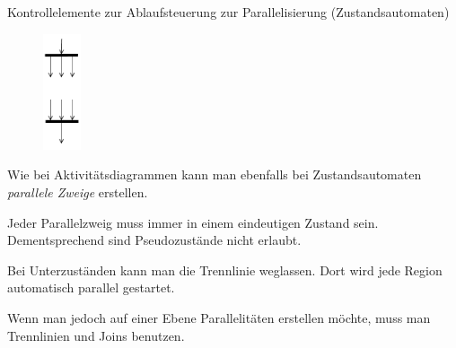 \begin{defi}{Kontrollelemente zur Ablaufsteuerung zur Parallelisierung (Zustandsautomaten)}
    \begin{figure}
        \centering
        \includegraphics[width=0.1\textwidth]{includes/figures/defi_diagrams_state_parallel.pdf}
    \end{figure}
    Wie bei Aktivitätsdiagrammen kann man ebenfalls bei Zustandsautomaten \emph{parallele Zweige} erstellen.

    Jeder Parallelzweig muss immer in einem eindeutigen Zustand sein.
    Dementsprechend sind Pseudozustände nicht erlaubt.

    Bei Unterzuständen kann man die Trennlinie weglassen.
    Dort wird jede Region automatisch parallel gestartet.

    Wenn man jedoch auf einer Ebene Parallelitäten erstellen möchte, muss man Trennlinien und Joins benutzen.

    \vspace{0.5cm}
\end{defi}

